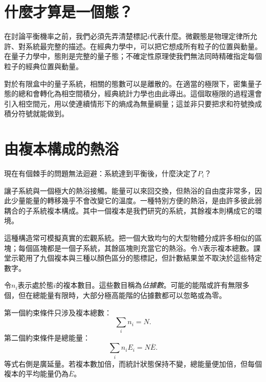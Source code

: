 \section{什麼才算是一個態？}

在討論平衡機率之前，我們必須先弄清楚標記\(i\)代表什麼。微觀態是物理定律所允許、對系統最完整的描述。在經典力學中，可以把它想成所有粒子的位置與動量。在量子力學中，態則是完整的量子態；不確定性原理使我們無法同時精確指定每個粒子的經典位置與動量。

對於有限盒中的量子系統，相關的態數可以是離散的。在適當的極限下，密集量子態的總和會轉化為相空間積分，經典統計力學也由此導出。這個取極限的過程還會引入相空間元，用以使連續情形下的熵成為無量綱量；這並非只要把求和符號換成積分符號就能做到。

\begin{classroomqa}\end{classroomqa}

\section{由複本構成的熱浴}

現在有個棘手的問題無法迴避：系統達到平衡後，什麼決定了\(P_i\)？

讓子系統與一個極大的熱浴接觸。能量可以來回交換，但熱浴的自由度非常多，因此少量能量的轉移幾乎不會改變它的溫度。一種特別方便的熱浴，是由許多彼此弱耦合的子系統複本構成。其中一個複本是我們研究的系統，其餘複本則構成它的環境。

這種構造常可模擬真實的宏觀系統。把一個大致均勻的大型物體分成許多相似的區塊；每個區塊都是一個子系統，其餘區塊則充當它的熱浴。令\(N\)表示複本總數。課堂示範用了九個複本與三種以顏色區分的態標記，但計數結果並不取決於這些特定數字。

令\(n_i\)表示處於態\(i\)的複本數目。這些數目稱為\emph{佔據數}。可能的能階或許有無限多個，但在總能量有限時，大部分極高能階的佔據數都可以忽略或為零。

第一個約束條件只涉及複本總數：\begin{equation}
 \sum_i n_i=N.
 \label{eq:sm3-number-constraint}
\end{equation}第二個約束條件是總能量：\begin{equation}
 \sum_i n_iE_i=N\overline E.
 \label{eq:sm3-total-energy-constraint}
\end{equation}等式右側是廣延量。若複本數加倍，而統計狀態保持不變，總能量便加倍，但每個複本的平均能量仍為\(\overline E\)。

